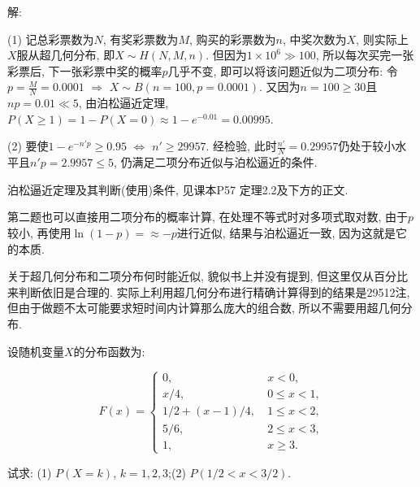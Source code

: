 \documentclass[standard]{ExBook}
\begin{document}
\begin{qitems}
    \begin{bbox}
解: 

(1) 记总彩票数为$N$, 有奖彩票数为$M$, 购买的彩票数为$n$, 中奖次数为$X$, 则实际上$X$服从超几何分布, 即$X\sim H(N,M,n)$. 但因为$1\times10^{6}\gg100$, 所以每次买完一张彩票后, 下一张彩票中奖的概率$p$几乎不变, 即可以将该问题近似为二项分布: 令$p=\frac{M}{N}=0.0001$ $\Longrightarrow$ $X\sim B(n=100,p=0.0001)$. 又因为$n=100\geq 30$且$np=0.01\ll5$, 由泊松逼近定理, $P(X \geq 1)=1-P(X=0)\approx1-e^{-0.01}=0.00995$.
    \end{bbox}

\vspace{-5em}

    \begin{bbox}
(2) 要使$1-e^{-n'p}\geq0.95$ $\Longleftrightarrow$ $n'\geq29957$. 经检验, 此时$\frac{n'}{N}=0.29957$仍处于较小水平且$n'p=2.9957 \leq 5$, 仍满足二项分布近似与泊松逼近的条件.

\textcolor{themeColor}{\selectfont {} 泊松逼近定理及其判断(使用)条件, 见课本P57 定理2.2及下方的正文.}

\textcolor{themeColor}{\selectfont {} 第二题也可以直接用二项分布的概率计算, 在处理不等式时对多项式取对数, 由于$p$较小, 再使用$\ln(1-p)=\approx-p$进行近似, 结果与泊松逼近一致, 因为这就是它的本质.}

\textcolor{themeColor}{\selectfont {} 关于超几何分布和二项分布何时能近似, 貌似书上并没有提到, 但这里仅从百分比来判断依旧是合理的. 实际上利用超几何分布进行精确计算得到的结果是29512注, 但由于做题不太可能要求短时间内计算那么庞大的组合数, 所以不需要用超几何分布.} 
    \end{bbox}

\vspace{-5em}

    \begin{bbox}
    \begin{shaded}
        \qitem
设随机变量$X$的分布函数为:
\vspace{-2em}
\begin{center}
\begin{equation}
    F(x)=
    \left\{
    \begin{array}{cl}
        \nonumber
        0,\ &x < 0,\\
        x/4,\ &0 \leq x < 1,\\
        1/2+(x-1)/4,\ &1 \leq x < 2,\\
        5/6,\ &2 \leq x <3,\\
        1,\ &x \geq 3.
    \end{array}
    \right.
\end{equation}
\end{center}
试求: (1) $P(X=k)$, $k=1,2,3$;\qquad(2) $P(1/2<x<3/2)$.
    \end{shaded}
    \end{bbox}


\end{qitems}
\end{document}
